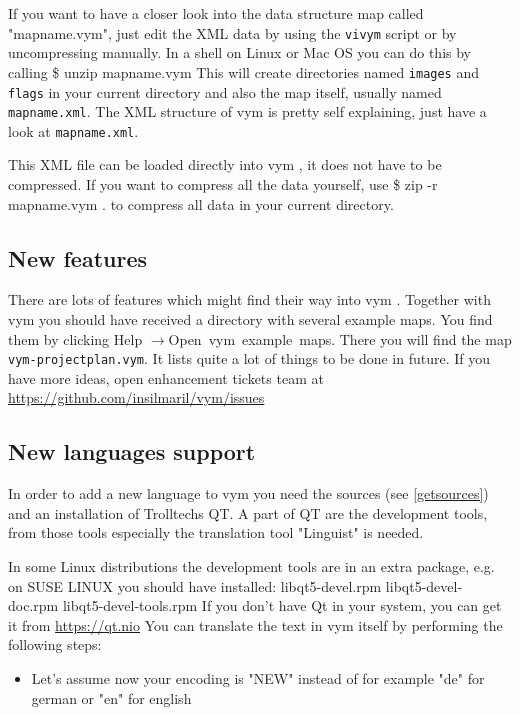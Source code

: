 \documentclass[12pt,a4paper]{article}
\newcommand{\vym}{{\sc vym }}
\newcommand{\ra}{$\longrightarrow$}
\newenvironment{code}[1] { \verbatim #1}{\endverbatim  }
\begin{document}
\begin{appendix}
If you want to have a closer look into the
data structure map called "mapname.vym", just edit the XML data 
by using the {\tt vivym} script or by uncompressing manually. In a shell
on Linux or Mac OS you can do this by calling
\begin{code}
\$ unzip mapname.vym
\end{code}
This will create directories named {\tt images} and {\tt flags} in your
current directory and also the map itself, usually named {\tt
mapname.xml}.  The XML structure of \vym is pretty self explaining, just
have a look at {\tt mapname.xml}.

This XML file can be loaded directly into \vym, it does not have to be
compressed. If you want to compress all the data yourself, use
\begin{code}
\$ zip -r mapname.vym .
\end{code}
to compress all data in your current directory.

\subsection{New features}
There are lots of features which might find their way into \vym.
Together with \vym you should have received a directory with several
example maps. You find them by clicking Help \ra Open~vym~example~maps.
There you will find the map {\tt vym-projectplan.vym}. It lists quite a
lot of things to be done in future. If you have more ideas, open
enhancement tickets  
team at
\href{https://github.com/insilmaril/vym/issues}{https://github.com/insilmaril/vym/issues}


\subsection{New languages support}
In order to add a new language to \vym you need the sources (see
\ref{getsources}) and an installation of Trolltechs QT. A part of QT are
the development tools, from those tools especially the translation tool
"Linguist" is needed. 

In some Linux distributions the development tools are in an extra
package, e.g. on SUSE LINUX you should have installed:
\begin{code}
libqt5-devel.rpm
libqt5-devel-doc.rpm
libqt5-devel-tools.rpm
\end{code}
If you don't have Qt in your system, you can get it from 
    \href{https://qt.io}{https://qt.nio}
    You can translate the text in vym
    itself by performing the following steps:
\begin{itemize}
    \item Let's assume now your encoding is "NEW" instead of for example
    "de" for german or "en" for english
    

\end{itemize}
\end{appendix}
\end{document}
